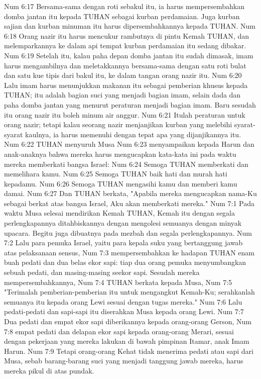 Num 6:17  Bersama-sama dengan roti sebakul itu, ia harus mempersembahkan domba jantan itu kepada TUHAN sebagai kurban perdamaian. Juga kurban sajian dan kurban minuman itu harus dipersembahkannya kepada TUHAN.
Num 6:18  Orang nazir itu harus mencukur rambutnya di pintu Kemah TUHAN, dan melemparkannya ke dalam api tempat kurban perdamaian itu sedang dibakar.
Num 6:19  Setelah itu, kalau paha depan domba jantan itu sudah dimasak, imam harus mengambilnya dan meletakkannya bersama-sama dengan satu roti bulat dan satu kue tipis dari bakul itu, ke dalam tangan orang nazir itu.
Num 6:20  Lalu imam harus menunjukkan makanan itu sebagai pemberian khusus kepada TUHAN; itu adalah bagian suci yang menjadi bagian imam, selain dada dan paha domba jantan yang menurut peraturan menjadi bagian imam. Baru sesudah itu orang nazir itu boleh minum air anggur.
Num 6:21  Itulah peraturan untuk orang nazir; tetapi kalau seorang nazir menjanjikan kurban yang melebihi syarat-syarat kaulnya, ia harus memenuhi dengan tepat apa yang dijanjikannya itu.
Num 6:22  TUHAN menyuruh Musa
Num 6:23  menyampaikan kepada Harun dan anak-anaknya bahwa mereka harus mengucapkan kata-kata ini pada waktu mereka memberkati bangsa Israel:
Num 6:24  Semoga TUHAN memberkati dan memelihara kamu.
Num 6:25  Semoga TUHAN baik hati dan murah hati kepadamu.
Num 6:26  Semoga TUHAN mengasihi kamu dan memberi kamu damai.
Num 6:27  Dan TUHAN berkata, "Apabila mereka mengucapkan nama-Ku sebagai berkat atas bangsa Israel, Aku akan memberkati mereka."
Num 7:1  Pada waktu Musa selesai mendirikan Kemah TUHAN, Kemah itu dengan segala perlengkapannya ditahbiskannya dengan mengolesi semuanya dengan minyak upacara. Begitu juga dibuatnya pada mezbah dan segala perlengkapannya.
Num 7:2  Lalu para pemuka Israel, yaitu para kepala suku yang bertanggung jawab atas pelaksanaan sensus,
Num 7:3  mempersembahkan ke hadapan TUHAN enam buah pedati dan dua belas ekor sapi: tiap dua orang pemuka menyumbangkan sebuah pedati, dan masing-masing seekor sapi. Sesudah mereka mempersembahkannya,
Num 7:4  TUHAN berkata kepada Musa,
Num 7:5  "Terimalah pemberian-pemberian itu untuk mengangkut Kemah-Ku; serahkanlah semuanya itu kepada orang Lewi sesuai dengan tugas mereka."
Num 7:6  Lalu pedati-pedati dan sapi-sapi itu diserahkan Musa kepada orang Lewi.
Num 7:7  Dua pedati dan empat ekor sapi diberikannya kepada orang-orang Gerson,
Num 7:8  empat pedati dan delapan ekor sapi kepada orang-orang Merari, sesuai dengan pekerjaan yang mereka lakukan di bawah pimpinan Itamar, anak Imam Harun.
Num 7:9  Tetapi orang-orang Kehat tidak menerima pedati atau sapi dari Musa, sebab barang-barang suci yang menjadi tanggung jawab mereka, harus mereka pikul di atas pundak.
